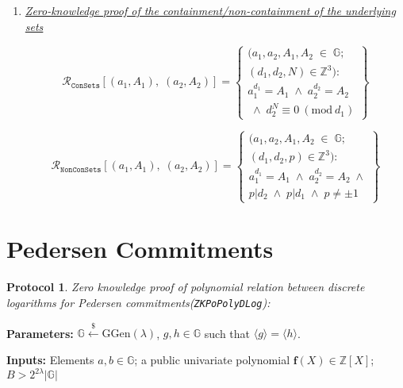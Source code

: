 \documentclass[11pt, lettersize, notitlepage, leqno, footskip=0.6cm]{article}
\newcommand{\bz}{\mathbb Z}
\newcommand{\ttt}{\texttt}
\newcommand{\bG}{\mathbb{G}}
\newcommand{\sett}{\ttt{Set}}
\newcommand{\la}{\langle}
\newcommand{\ra}{\rangle}
\newcommand{\mc}{\mathcal}
\newcommand{\mb}{\mathbb}
\newcommand{\mbf}{\mathbf}
\newcommand{\mr}{\mathrm}
\newcommand{\lam}{\lambda}
\newcommand{\lamb}{\lambda}
\newcommand{\sub}{\subseteq}
\newcommand{\mcM}{\mc{M}}
\newcommand{\noin}{\noindent}
\newcommand{\Mod}[1]{\ (\mathrm{mod}\ #1)}
\newtheorem{Prot}[Thm]{Protocol}
\numberwithin{equation}{section}
\begin{document}
{{{\begin{enumerate}[wide, labelwidth=!, labelindent=0pt]
\item \hyperlink{Sets}{\textit{Zero-knowledge proof of the containment/non-containment of the underlying sets}}\vspace{-0.3cm}


\[
  \mc{R}_{\ttt{ConSets}}[(a_1, A_1),\;(a_2,A_2)] = \left\{\begin{array}{l}
    (a_1,a_2, A_1, A_2\;\in\;\mb{G}; \\
    (d_1, d_2, N) \in \bz^3):   \\
    a_1^{d_1} = A_1\;\wedge\;a_2^{d_2} = A_2\\
    \;\wedge\;d_2^{N}\equiv 0\Mod{d_1} 
  \end{array}\right\}
\]


\[
  \mc{R}_{\ttt{NonConSets}}[(a_1, A_1),\;(a_2,A_2)] = \left\{\begin{array}{l}
    (a_1,a_2, A_1, A_2\;\in\;\mb{G}; \\
    (d_1, d_2, p) \in \bz^3):   \\
    a_1^{d_1} = A_1\;\wedge\;a_2^{d_2} = A_2\;\wedge\\
   p \big| d_2\; \wedge\; p \big| d_1 \; \wedge\; p\neq \pm 1 
  \end{array}\right\}
\]


\end{enumerate}



\section{\fontsize{11}{11}\selectfont Pedersen Commitments}


\begin{Prot} \normalfont \hypertarget{Poly}{\textit{Zero knowledge proof of polynomial relation between discrete logarithms for Pedersen commitments}}(\verb|ZKPoPolyDLog|):\end{Prot} \vspace{-0.3cm}

\noin \textbf{Parameters:} $\mb{G}\xleftarrow{\$} \mr{GGen}(\lamb)$,  $g,h\in \mb{G}$ such that $\la g \ra = \la h \ra$.

\noin \textbf{Inputs:} Elements $a,b \in \mb{G}$; a public univariate polynomial $\mbf{f}(X)\in \bz[X]$; $B > 2^{2\lam}|\bG|$

}}}
\end{document}
